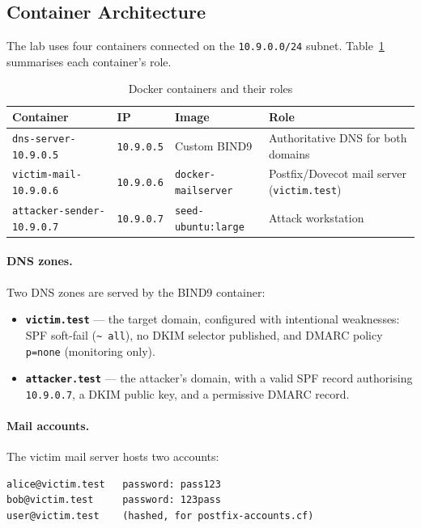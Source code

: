\documentclass[11pt]{article}
\begin{document}
\subsection{Container Architecture}

The lab uses four containers connected on the \texttt{10.9.0.0/24}
subnet.
Table~\ref{tab:containers} summarises each container's role.

\begin{table}[h]
\centering
\caption{Docker containers and their roles}
\label{tab:containers}
\begin{tabularx}{\textwidth}{@{} l l l >{\raggedright\arraybackslash}X @{}}
\toprule
\textbf{Container} & \textbf{IP} & \textbf{Image} & \textbf{Role} \\
\midrule
\texttt{dns-server-10.9.0.5}
  & \texttt{10.9.0.5}
  & Custom BIND9
  & Authoritative DNS for both domains \\
\texttt{victim-mail-10.9.0.6}
  & \texttt{10.9.0.6}
  & \texttt{docker-mailserver}
  & Postfix/Dovecot mail server (\texttt{victim.test}) \\
\texttt{attacker-sender-10.9.0.7}
  & \texttt{10.9.0.7}
  & \texttt{seed-ubuntu:large}
  & Attack workstation \\
\bottomrule
\end{tabularx}
\end{table}


\paragraph{DNS zones.}
Two DNS zones are served by the BIND9 container:

\begin{itemize}[noitemsep]
  \item \textbf{\texttt{victim.test}} --- the target domain, configured
    with intentional weaknesses: SPF soft-fail (\texttt{\textasciitilde
    all}), no DKIM selector published, and DMARC policy
    \texttt{p=none} (monitoring only).
  \item \textbf{\texttt{attacker.test}} --- the attacker's domain, with
    a valid SPF record authorising \texttt{10.9.0.7}, a DKIM public key,
    and a permissive DMARC record.
\end{itemize}

\paragraph{Mail accounts.}
The victim mail server hosts two accounts:
\begin{listing}[H]
\begin{verbatim}
alice@victim.test   password: pass123
bob@victim.test     password: 123pass
user@victim.test    (hashed, for postfix-accounts.cf)
\end{verbatim}
\end{listing}
\end{document}
